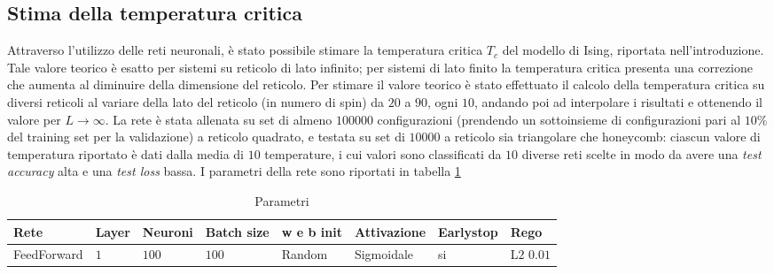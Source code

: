 \documentclass{article}
\begin{document}
\subsection{Stima della temperatura critica}
Attraverso l'utilizzo delle reti neuronali, è stato possibile stimare la temperatura critica $T_c$ del modello di Ising, riportata nell'introduzione. Tale valore teorico è esatto per sistemi su reticolo di lato infinito; per sistemi di lato finito la temperatura critica presenta una correzione che aumenta al diminuire della dimensione del reticolo. Per stimare il valore teorico è stato effettuato il calcolo della temperatura critica su diversi reticoli al variare della lato del reticolo (in numero di spin) da $20$ a $90$, ogni $10$, andando poi ad interpolare i risultati e ottenendo il valore per $L\rightarrow \infty$.
La rete è stata allenata su set di almeno $100000$ configurazioni (prendendo un sottoinsieme di configurazioni pari al $10\%$ del training set per la validazione) a reticolo quadrato, e testata su set di $10000$ a reticolo sia triangolare che honeycomb: ciascun valore di temperatura riportato è dati dalla media di $10$ temperature, i cui valori sono classificati da $10$ diverse reti scelte in modo da avere una \emph{test accuracy} alta e una \emph{test loss} bassa. I parametri della rete sono riportati in tabella \ref{tab:ffnnpar}
\begin{table}[h]
\begin{center}
\begin{tabular}{llllllll}
\toprule
Rete & Layer & Neuroni & Batch size & w e b init & Attivazione & Earlystop & Rego\\
\midrule
FeedForward & $1$ & $100$ & $100$ & Random & Sigmoidale & si & L$2$ $0.01$\\
\bottomrule
\end{tabular}
\end{center}
\caption{Parametri}
\label{tab:ffnnpar}
\end{table}

\begin{figure}
\centering
{}
\end{figure}





\end{document}
